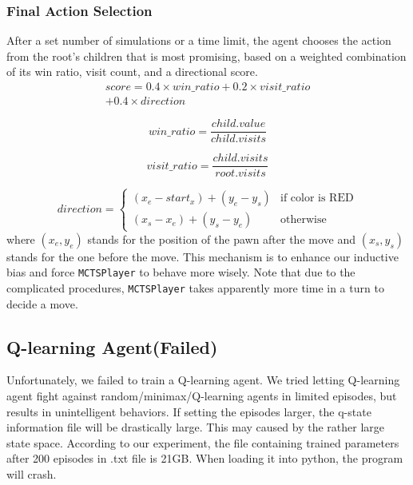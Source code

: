 \subsubsection{Final Action Selection}
After a set number of simulations or a time limit, the agent chooses the action from the root's children that is most promising, based on a weighted combination of its win ratio, visit count, and a directional score.
\begin{equation}
\begin{split}
    score = 0.4 \times win\_ratio + 0.2 \times visit\_ratio \\ +  0.4 \times direction
\end{split}
\end{equation}

\begin{equation}
win\_ratio = \frac{child.value}{child.visits}
\end{equation}

\begin{equation}
visit\_ratio = \frac{child.visits}{root.visits}
\end{equation}

\begin{equation}
direction =
\begin{cases}
(x_e - start_x) + (y_e - y_s) & \text{if color is RED} \\
(x_s - x_e) + (y_s - y_e) & \text{otherwise}
\end{cases}
\end{equation}
where $(x_e, y_e)$ stands for the position of the pawn after the move and $(x_s, y_s)$ stands for the one before the move. This mechanism is to enhance our inductive bias and force \texttt{MCTSPlayer} to behave more wisely. Note that due to the complicated procedures, \texttt{MCTSPlayer} takes apparently more time in a turn to decide a move. 

\subsection{Q-learning Agent(Failed)}
Unfortunately, we failed to train a Q-learning agent. We tried letting Q-learning agent fight against random/minimax/Q-learning agents in limited episodes, but results in unintelligent behaviors. If setting the episodes larger, the q-state information file will be drastically large. This may caused by the rather large state space. According to our experiment, the file containing trained parameters after 200 episodes in .txt file is 21GB. When loading it into python, the program will crash.  

